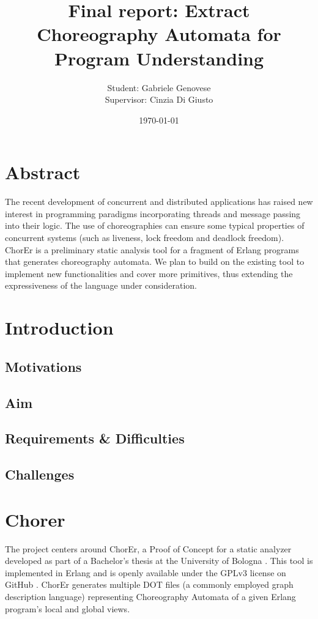 \documentclass{article}
\title{Final report: Extract Choreography Automata for Program Understanding}
\author{Student: Gabriele Genovese\\Supervisor: Cinzia Di Giusto}
\date{\today}
\theoremstyle{definition}
\theoremstyle{definition}
\begin{document}
\maketitle


\section*{Abstract}
The recent development of concurrent and distributed applications has raised new
interest in programming paradigms incorporating threads and message passing into
their logic. The use of choreographies
can ensure some typical properties of concurrent systems (such as liveness, lock
freedom and deadlock freedom). ChorEr is a preliminary static analysis tool for
a fragment of Erlang programs that generates choreography automata. We plan to
build on the existing tool to implement new functionalities and cover more
primitives, thus extending the expressiveness of the language under consideration.

\newpage

\tableofcontents

\newpage

\section{Introduction}


\subsection{Motivations}


\subsection{Aim}


\subsection{Requirements \& Difficulties}


\subsection{Challenges}


\section{Chorer}
The project centers around ChorEr, a Proof of Concept for a static analyzer 
developed as part of a Bachelor's thesis at the University of Bologna 
\cite{genovese2023chorer}. This tool is implemented in Erlang and is openly 
available under the GPLv3 license on GitHub \cite{website:chorer}. ChorEr 
generates multiple DOT files (a commonly employed graph description language) 
representing Choreography Automata of a given Erlang program's local and 
global views.
\end{document}

